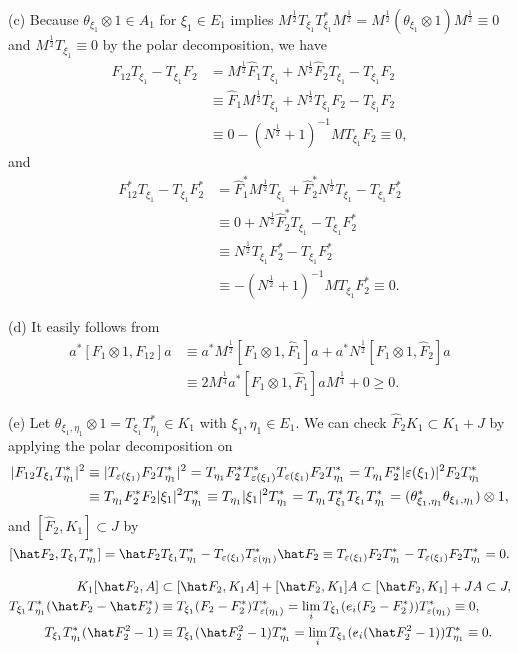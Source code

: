 \documentclass{../../large}
\begin{document}
\begin{pf}
(c)
Because $\theta_{\xi_1}\otimes1\in A_1$ for $\xi_1\in E_1$ implies $M^{\frac12}T_{\xi_1}T_{\xi_1}^*M^{\frac12}=M^{\frac12}(\theta_{\xi_1}\otimes1)M^{\frac12}\equiv0$ and $M^{\frac12}T_{\xi_1}\equiv0$ by the polar decomposition, we have
\begin{align*}
F_{12}T_{\xi_1}-T_{\xi_1}F_2
&=M^{\frac12}\hat F_1T_{\xi_1}+N^{\frac12}\hat F_2T_{\xi_1}-T_{\xi_1}F_2\\
&\equiv\hat F_1M^{\frac12}T_{\xi_1}+N^{\frac12}T_{\xi_1}F_2-T_{\xi_1}F_2\\
&\equiv0-(N^{\frac12}+1)^{-1}MT_{\xi_1}F_2\equiv0,
\end{align*}
and
\begin{align*}
F_{12}^*T_{\xi_1}-T_{\xi_1}F_2^*
&=\hat F_1^*M^{\frac12}T_{\xi_1}+\hat F_2^*N^{\frac12}T_{\xi_1}-T_{\xi_1}F_2^*\\
&\equiv0+N^{\frac12}\hat F_2^*T_{\xi_1}-T_{\xi_1}F_2^*\\
&\equiv N^{\frac12}T_{\xi_1}F_2^*-T_{\xi_1}F_2^*\\
&\equiv-(N^{\frac12}+1)^{-1}MT_{\xi_1}F_2^*\equiv0.
\end{align*}

(d)
It easily follows from
\begin{align*}
a^*[F_1\otimes1,F_{12}]a
&\equiv a^*M^{\frac12}[F_1\otimes1,\hat F_1]a+a^*N^{\frac12}[F_1\otimes1,\hat F_2]a\\
&\equiv2M^{\frac14}a^*[F_1\otimes1,\hat F_1]aM^{\frac14}+0\ge0.
\end{align*}

(e)
Let $\theta_{\xi_1,\eta_1}\otimes1=T_{\xi_1}T_{\eta_1}^*\in K_1$ with $\xi_1,\eta_1\in E_1$.
We can check $\hat F_2K_1\subset K_1+J$ by applying the polar decomposition on
\begin{align*}
|F_{12}T_{\xi_1}T_{\eta_1}^*|^2
&\equiv|T_{\varepsilon(\xi_1)}F_2T_{\eta_1}^*|^2
=T_{\eta_1}F_2^*T_{\varepsilon(\xi_1)}^*T_{\varepsilon(\xi_1)}F_2T_{\eta_1}^*
=T_{\eta_1}F_2^*|\varepsilon(\xi_1)|^2F_2T_{\eta_1}^*\\
&\equiv T_{\eta_1}F_2^*F_2|\xi_1|^2T_{\eta_1}^*
\equiv T_{\eta_1}|\xi_1|^2T_{\eta_1}^*
=T_{\eta_1}T_{\xi_1}^*T_{\xi_1}T_{\eta_1}^*
=(\theta_{\xi_1,\eta_1}^*\theta_{\xi_1,\eta_1})\otimes1,
\end{align*}
and $[\hat F_2,K_1]\subset J$ by
\[[\hat F_2,T_{\xi_1}T_{\eta_1}^*]=\hat F_2T_{\xi_1}T_{\eta_1}^*-T_{\e(\xi_1)}T_{\e(\eta_1)}^*\hat F_2\equiv T_{\e(\xi_1)}F_2T_{\eta_1}^*-T_{\e(\xi_1)}F_2T_{\eta_1}^*=0.\]


\begin{align*}
K_1[\hat F_2,A]&\subset[\hat F_2,K_1A]+[\hat F_2,K_1]A\subset[\hat F_2,K_1]+JA\subset J,\\
T_{\xi_1}T_{\eta_1}^*(\hat F_2-\hat F_2^*)&\equiv T_{\xi_1}(F_2-F_2^*)T_{\e(\eta_1)}^*=\lim_iT_{\xi_1}(e_i(F_2-F_2^*))T_{\e(\eta_1)}^*\equiv0,\\
T_{\xi_1}T_{\eta_1}^*(\hat F_2^2-1)&\equiv T_{\xi_1}(\hat F_2^2-1)T_{\eta_1}^*=\lim_iT_{\xi_1}(e_i(\hat F_2^2-1))T_{\eta_1}^*\equiv0.
\end{align*}


\end{pf}
\end{document}
